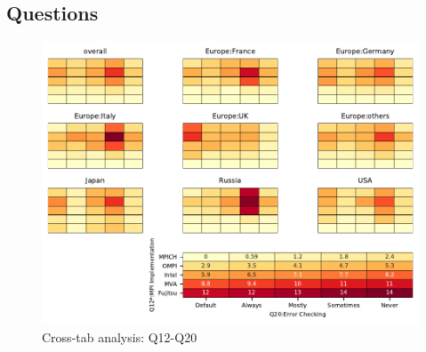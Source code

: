
\subsection{Questions}


\begin{figure}
\begin{center}
\includegraphics[width=12cm]{../pdfs/Q12-Q20.pdf}
\caption{Cross-tab analysis: Q12-Q20}
\label{fig:Q12-Q20}
\end{center}
\end{figure}
